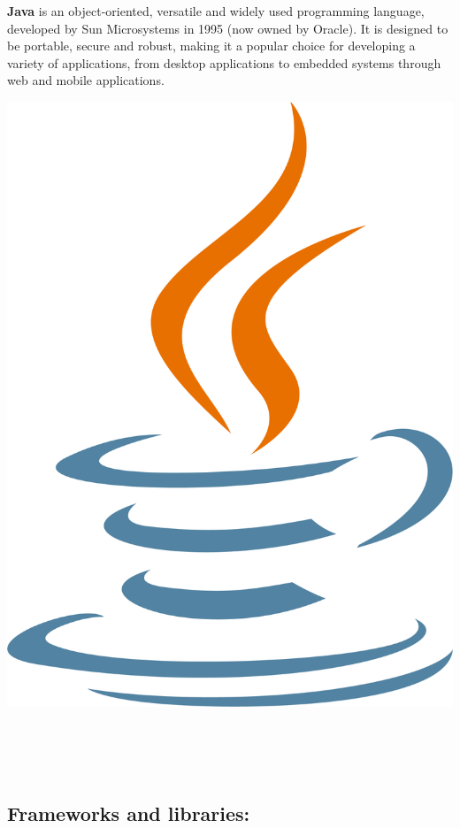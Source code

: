 \noindent%
\begin{minipage}{.7\textwidth}%
    \textbf{Java} is an object-oriented, versatile and widely used programming language, developed by Sun Microsystems in 1995 (now owned by Oracle). It is designed to be portable, secure and robust, making it a popular choice for developing a variety of applications, from desktop applications to embedded systems through web and mobile applications.
\end{minipage}%
\hfill
\begin{minipage}{.20\textwidth}%
\includegraphics[width=\textwidth]{images/java.png}
\end{minipage} \\ \\ \\ 

\subsection{Frameworks and libraries:}

